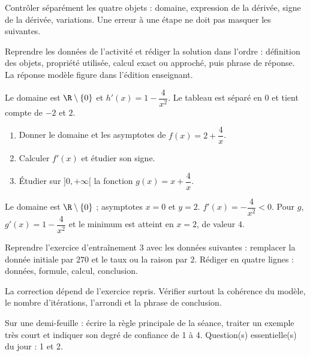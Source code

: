 \begin{summary}Contrôler séparément les quatre objets : domaine, expression de la dérivée, signe de la dérivée, variations. Une erreur à une étape ne doit pas masquer les suivantes.\end{summary}

\begin{example}
Reprendre les données de l'activité et rédiger la solution dans l'ordre : définition des objets, propriété utilisée, calcul exact ou approché, puis phrase de réponse. La réponse modèle figure dans l'édition enseignant.
\end{example}
\begin{solution}Le domaine est $\R\setminus\{0\}$ et $h'(x)=1-\dfrac4{x^2}$. Le tableau est séparé en $0$ et tient compte de $-2$ et $2$.\end{solution}

\begin{exercise}[essentiel]
\begin{enumerate}\item Donner le domaine et les asymptotes de $f(x)=2+\dfrac{4}x$.\item Calculer $f'(x)$ et étudier son signe.\item Étudier sur $]0,+\infty[$ la fonction $g(x)=x+\dfrac{4}x$.\end{enumerate}
\end{exercise}
\begin{solution}Le domaine est $\R\setminus\{0\}$ ; asymptotes $x=0$ et $y=2$. $f'(x)=-\dfrac{4}{x^2}<0$. Pour $g$, $g'(x)=1-\dfrac{4}{x^2}$ et le minimum est atteint en $x=2$, de valeur $4$.\end{solution}


\begin{homework}Reprendre l'exercice d'entraînement 3 avec les données suivantes : remplacer la donnée initiale par $270$ et le taux ou la raison par $2$. Rédiger en quatre lignes : données, formule, calcul, conclusion.\end{homework}
\begin{solution}La correction dépend de l'exercice repris. Vérifier surtout la cohérence du modèle, le nombre d'itérations, l'arrondi et la phrase de conclusion.\end{solution}

\begin{exitticket}[3 minutes]Sur une demi-feuille : écrire la règle principale de la séance, traiter un exemple très court et indiquer son degré de confiance de 1 à 4. Question(s) essentielle(s) du jour : 1 et 2.\end{exitticket}

